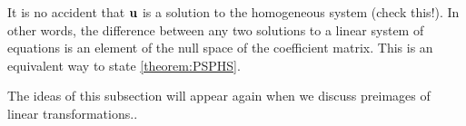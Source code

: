 \documentclass{ximera}
\begin{document}
\begin{example}
  \begin{feedback}[correct]
    It is no accident that $\mathbf{u}$ is a solution to the homogeneous
    system (check this!).  In other words, the difference between any
    two solutions to a linear system of equations is an element of the
    null space of the coefficient matrix.  This is an equivalent way
    to state \ref{theorem:PSPHS}.
  \end{feedback}
\end{example}

The ideas of this subsection will appear again when we discuss
preimages of linear transformations..
\end{document}
